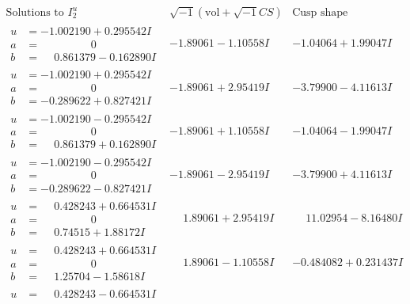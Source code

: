 \documentclass[1p]{elsarticle_modified}
\theoremstyle{definition}
\newcommand{\I}{\sqrt{-1}}
\begin{document}
$$\begin{array}{c|c|c}  
\text{Solutions to }I^u_{2}& \I (\text{vol} + \sqrt{-1}CS) & \text{Cusp shape}\\
 \hline 
\begin{aligned}
u &= -1.002190 + 0.295542 I \\
a &= \phantom{-0.000000 } 0 \\
b &= \phantom{-}0.861379 - 0.162890 I\end{aligned}
 & -1.89061 - 1.10558 I & -1.04064 + 1.99047 I \\ \hline\begin{aligned}
u &= -1.002190 + 0.295542 I \\
a &= \phantom{-0.000000 } 0 \\
b &= -0.289622 + 0.827421 I\end{aligned}
 & -1.89061 + 2.95419 I & -3.79900 - 4.11613 I \\ \hline\begin{aligned}
u &= -1.002190 - 0.295542 I \\
a &= \phantom{-0.000000 } 0 \\
b &= \phantom{-}0.861379 + 0.162890 I\end{aligned}
 & -1.89061 + 1.10558 I & -1.04064 - 1.99047 I \\ \hline\begin{aligned}
u &= -1.002190 - 0.295542 I \\
a &= \phantom{-0.000000 } 0 \\
b &= -0.289622 - 0.827421 I\end{aligned}
 & -1.89061 - 2.95419 I & -3.79900 + 4.11613 I \\ \hline\begin{aligned}
u &= \phantom{-}0.428243 + 0.664531 I \\
a &= \phantom{-0.000000 } 0 \\
b &= \phantom{-}0.74515 + 1.88172 I\end{aligned}
 & \phantom{-}1.89061 + 2.95419 I & \phantom{-}11.02954 - 8.16480 I \\ \hline\begin{aligned}
u &= \phantom{-}0.428243 + 0.664531 I \\
a &= \phantom{-0.000000 } 0 \\
b &= \phantom{-}1.25704 - 1.58618 I\end{aligned}
 & \phantom{-}1.89061 - 1.10558 I & -0.484082 + 0.231437 I \\ \hline\begin{aligned}
u &= \phantom{-}0.428243 - 0.664531 I \\

\end{aligned}
\end{array}$$
\end{document}

